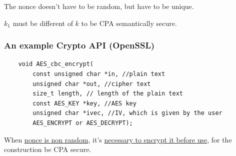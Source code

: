 \documentclass[12pt]{book}
\begin{document}
The nonce doesn't have to be random, but have to be unique.

$k_{1}$ must be different of $k$ to be CPA semantically secure.

\subsubsection{An example Crypto API (OpenSSL)}
\begin{verbatim}
    void AES_cbc_encrypt(
        const unsigned char *in, //plain text
        unsigned char *out, //cipher text
        size_t length, // length of the plain text
        const AES_KEY *key, //AES key
        unsigned char *ivec, //IV, which is given by the user
        AES_ENCRYPT or AES_DECRYPT);
\end{verbatim}
When \underline{nonce is non random}, it's \underline{necessary to encrypt it before use}, for the construction be CPA secure.
\end{document}
